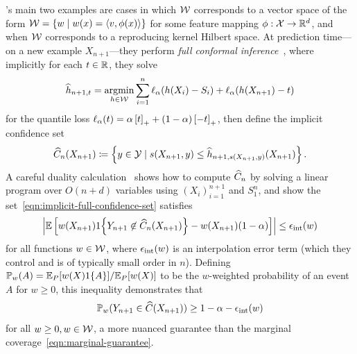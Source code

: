\documentclass[11pt]{article}
\newcommand{\loss}{\ell}
\newcommand{\scorefunc}{s}
\newcommand{\scoreval}{\scorefunc}
\newcommand{\scorerv}{S}
\begin{document}
\citeauthor{GibbsChCa23}'s main two examples are cases in which $\mathcal{W}$
corresponds to a vector space of the form $\mathcal{W} = \{w \mid w(x) = \langle v,
\phi(x)\rangle\}$ for some feature mapping $\phi : \mathcal{X} \to \mathbb{R}^d$, and when
$\mathcal{W}$ corresponds to a reproducing kernel Hilbert space.
%
At prediction time---on a new example $X_{n + 1}$---they perform
\emph{full conformal inference}~\cite{VovkGaSh05},
where implicitly for each $t \in \mathbb{R}$, they solve
\begin{equation*}
  \what{h}_{n+1,t}
  = \argmin_{h \in \mc{W}}
  \sum_{i = 1}^n \loss_\alpha(h(X_i) - \scorerv_i)
  + \loss_\alpha(h(X_{n+1}) - t)
\end{equation*}
for the quantile loss $\loss_\alpha(t) = \alpha \hinge{t}
+ (1 - \alpha) \hinge{-t}$,
then define the implicit confidence set
\begin{equation}
  \what{C}_{n}(X_{n+1}) \defeq \left\{y \in \mc{Y}
  \mid \scoreval(X_{n + 1}, y) \le \what{h}_{n + 1, \scoreval(X_{n + 1},
    y)}(X_{n + 1}) \right\}.
  \label{eqn:implicit-full-confidence-set}
\end{equation}
A careful duality calculation~\cite[Sec.~4]{GibbsChCa23}
shows how to compute $\widehat{C}_n$ by solving a linear program
over $O(n + d)$ variables using $(X_i)_{i = 1}^{n + 1}$
and $\scorerv_1^n$,
and \citeauthor{GibbsChCa23}
show the set~\eqref{eqn:implicit-full-confidence-set}
satisfies
\begin{equation*}
  \left|\mathbb{E}\left[w(X_{n+1})1\!\left\{
      Y_{n + 1} \not \in \widehat{C}_n(X_{n+1})\right\}
    - w(X_{n + 1}) (1 - \alpha)\right]\right|
  \le \epsilon_{\textup{int}}(w)
\end{equation*}
for all functions $w \in \mathcal{W}$, where $\epsilon_{\textup{int}}(w)$ is an
interpolation error term (which they control and is of typically
small order in $n$).
%
Defining $\mathbb{P}_w(A) = \mathbb{E}_P[w(X)
  1\!\left\{A\right\}] / \mathbb{E}_P[w(X)]$ to be the $w$-weighted probability of an event
$A$ for $w \ge 0$, this inequality demonstrates that
\begin{equation}
  \label{eqn:cherian-gibbs-guarantee}
  \mathbb{P}_w(Y_{n + 1} \in \widehat{C}(X_{n + 1})) \ge 1 - \alpha
  - \epsilon_{\textup{int}}(w)
\end{equation}
for all $w \ge 0, w \in \mathcal{W}$,
a more nuanced guarantee than the marginal
coverage~\eqref{eqn:marginal-guarantee}.
\end{document}
